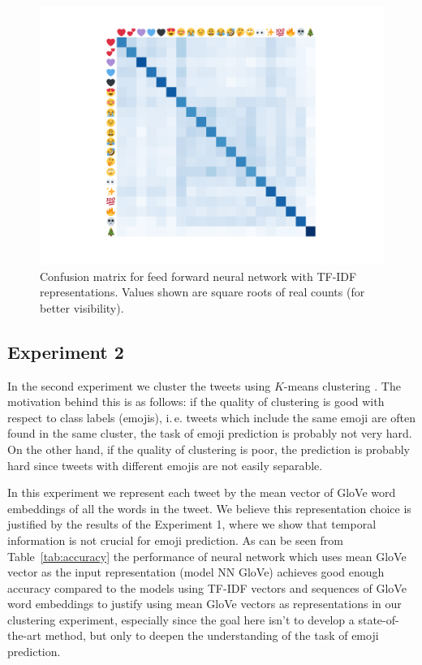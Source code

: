 \documentclass[10pt, a4paper]{article}
\begin{document}
\begin{figure}
\begin{center}
\includegraphics[width=0.8\columnwidth]{img/confusion_matrix.pdf}
\caption{Confusion matrix for feed forward neural network with TF-IDF 
representations. Values shown are square roots of real counts (for better 
visibility).}
\label{fig:confusion_matrix}
\end{center}
\end{figure}

\subsection{Experiment 2}

In the second experiment we cluster the tweets using $K$-means clustering 
\citep{bishop2006pattern}. The motivation behind this is as follows: if the 
quality of clustering is good with respect to class labels (emojis), i.\,e. 
tweets which include the same emoji are often found in the same cluster, the
task of emoji prediction is probably not very hard. On the other hand, if the 
quality of clustering is poor, the prediction is probably hard since tweets with
different emojis are not easily separable.

In this experiment we represent each tweet by the mean vector of GloVe word 
embeddings of all the words in the tweet. We believe this representation choice 
is justified by the results of the Experiment 1, where we show that temporal 
information is not crucial for emoji prediction. As can be seen from 
Table~\ref{tab:accuracy} the performance of neural network which uses mean GloVe 
vector as the input representation (model NN GloVe) achieves good enough 
accuracy compared to the models using TF-IDF vectors and sequences of GloVe word
embeddings to justify using mean GloVe vectors as representations in our 
clustering experiment, especially since the goal here isn't to develop a 
state-of-the-art method, but only to deepen the understanding of the task of 
emoji prediction.
\end{document}
